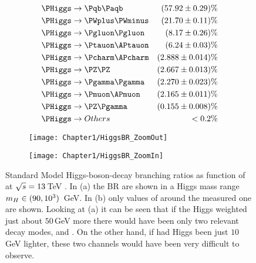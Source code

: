 \begin{minipage}[t]{0.4\textwidth}
  \centering{}
\end{minipage}\hfill
\begin{minipage}[t]{0.6\textwidth}
\begin{flushleft}
\begin{align*}
	\PHiggs &\rightarrow  \bbbar 			& (57.92 \pm 0.29)\% \\
	\PHiggs &\rightarrow  \PWplus\PWminus	& (21.70 \pm 0.11)\% \\
	\PHiggs &\rightarrow  \Pgluon \Pgluon 	& (8.17 \pm 0.26)\% \\ 
	\PHiggs &\rightarrow  \Ptauon\APtauon	& (6.24 \pm 0.03)\% \\
	\PHiggs &\rightarrow  \Pcharm \APcharm	& (2.888 \pm 0.014)\% \\ 
	\PHiggs &\rightarrow  \PZ\PZ			& (2.667 \pm 0.013)\% \\  
	\PHiggs &\rightarrow  \Pgamma \Pgamma	& (2.270 \pm 0.023)\% \\ 
	\PHiggs &\rightarrow  \Pmuon\APmuon	& (2.165 \pm 0.011)\% \\  
	\PHiggs &\rightarrow  \PZ \Pgamma		& (0.155 \pm 0.008)\% \\
	\PHiggs &\rightarrow Others			& < 0.2 \%
\end{align*}
\end{flushleft}
\end{minipage}


\begin{figure}
\centering
\begin{subfigure}{.5\textwidth}
  \centering
  \texttt{[image: Chapter1/HiggsBR\_ZoomOut]}
  \caption{}
  \label{fig:Chap1:Higgs:BR:Out}
\end{subfigure}%
\begin{subfigure}{.5\textwidth}
  \centering
  \texttt{[image: Chapter1/HiggsBR\_ZoomIn]}
  \caption{}
  \label{fig:Chap1:Higgs:BR:In}
\end{subfigure}
\caption{Standard Model Higgs-boson-decay branching ratios as function of \mH at $\sqrt{s}=13\,$TeV \cite{LHCHiggsCrossSectionWorkingGroup:2016ypw}. In (a) the BR are shown in a Higgs mass 
range $m_{H} \in (90, 10^3)\,$ GeV.  In (b) only values of \mH around the measured one are shown.
 Looking at (a) it can be seen that if the Higgs 
weighted just about $50\,$GeV more there would have been only two relevant decay 
modes, \HWW and \HZZ. On the other hand, if had Higgs been just $10\,$GeV lighter, these
two channels would have been very difficult to observe.}
\label{fig:Chap1:Higgs:BR}
\end{figure} %

